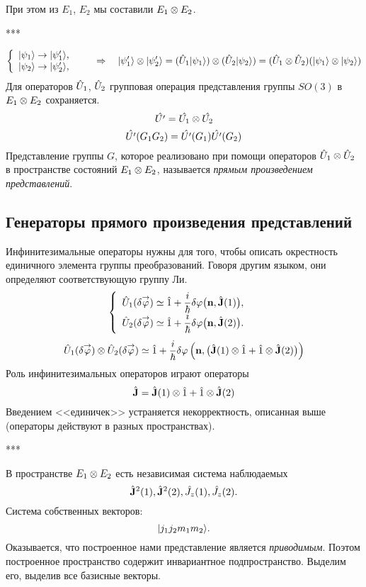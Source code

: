 При этом из $E_1$, $E_2$ мы составили $E_1 \otimes E_2$.

***

$$
    \left\{
      \begin{array}{ll}
        | \psi_1 \rangle \to | \psi'_1 \rangle, & \hbox{} \\
        | \psi_2 \rangle \to | \psi'_2 \rangle, & \hbox{}
      \end{array}
    \right.
    \quad \Rightarrow \quad
    | \psi'_1 \rangle \otimes | \psi'_2 \rangle = (\Hat U_1 | \psi_1 \rangle) \otimes (\Hat U_2 | \psi_2 \rangle)
    =
    (\Hat U_1 \otimes \Hat U_2)(| \psi_1 \rangle \otimes | \psi_2 \rangle)
$$
\Lem Для операторов $\Hat U_1$, $\Hat U_2$ групповая операция представления группы $SO(3)$ в $E_1 \otimes E_2$ сохраняется.
$$
    \Hat{U'} = \Hat{U_1} \otimes \Hat{U_2}
$$
$$
    \Hat{U'} (G_1 G_2) = \Hat{U'}(G_1) \Hat{U'} (G_2)
$$
\Def Представление группы $G$, которое реализовано при помощи операторов $\Hat U_1 \otimes \Hat U_2$ в пространстве состояний $E_1 \otimes E_2$,  называется \emph{прямым произведением представлений}.

\subsection{Генераторы прямого произведения представлений}

\Reminder Инфинитезимальные операторы нужны для того, чтобы описать окрестность единичного элемента группы преобразований. Говоря другим языком, они определяют соответствующую группу Ли.
$$
    \left\{
      \begin{array}{ll}
        \Hat U_1 (\delta \overset{\to}{\varphi}) \simeq \Hat 1 + \dfrac{i}{\hbar} \delta \varphi \big( \mathbf n, \Hat{\mathbf J}(1) \big), & \hbox{} \\
        \Hat U_2 (\delta \overset{\to}{\varphi}) \simeq \Hat 1 + \dfrac{i}{\hbar} \delta \varphi \big( \mathbf n, \Hat{\mathbf J}(2) \big). & \hbox{} \end{array}
    \right.
$$
$$
    \Hat U_1 (\delta \overset{\to}{\varphi}) \otimes \Hat U_2 (\delta \overset{\to}{\varphi}) \simeq \Hat 1 + \dfrac{i}{\hbar}
    \delta \varphi \left(
        \mathbf n ,
        \big(
            \Hat{\mathbf J}(1) \otimes \Hat 1 + \Hat 1 \otimes \Hat{\mathbf J}(2)
        \big)
    \right)
$$
Роль инфинитезимальных операторов играют операторы
$$
    \Hat{\mathbf J} = \Hat{\mathbf J}(1) \otimes \Hat 1 + \Hat 1 \otimes \Hat{\mathbf J}(2)
$$
Введением <<единичек>> устраняется некорректность, описанная выше (операторы действуют в разных пространствах).

***

В пространстве $E_1 \otimes E_2$ есть независимая система наблюдаемых
$$
    \Hat{\mathbf J}^2 (1), \Hat{\mathbf J}^2(2), \Hat J_z(1), \Hat J_z(2).
$$
Система собственных векторов:
$$
    | j_1 j_2 m_1 m_2 \rangle.
$$
Оказывается, что построенное нами представление является \emph{приводимым}. Поэтом построенное пространство содержит инвариантное подпространство. Выделим его, выделив все базисные векторы.

